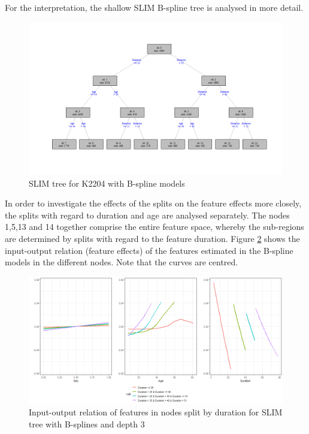 For the interpretation, the shallow SLIM B-spline tree is analysed in more detail.

\begin{figure}[!htb]
    \centering   
    \includegraphics[width = 16cm]{Figures/insurance_use_case/k2204_BPV/slim_bsplines_small_tree.png}
    \caption{SLIM tree for K2204 with B-spline models}
    \label{fig:ins_slim_bsplines_tree}
\end{figure}

In order to investigate the effects of the splits on the feature effects more closely, the splits with regard to duration and age are analysed separately.
The nodes 1,5,13 and 14 together comprise the entire feature space, whereby the sub-regions are determined by splits with regard to the feature duration.
Figure \ref{fig:ins_k2204_effects_duration} shows the input-output relation (feature effects) of the features estimated in the B-spline models in the different nodes. Note that the curves are centred.

\begin{figure}[!htb]
    \centering
    \includegraphics[width = 16cm]{Figures/insurance_use_case/k2204_BPV/effects_duration.png}
    \caption{Input-output relation of features in nodes split by duration for SLIM tree with B-splines and depth 3}
    \label{fig:ins_k2204_effects_duration}
\end{figure}

